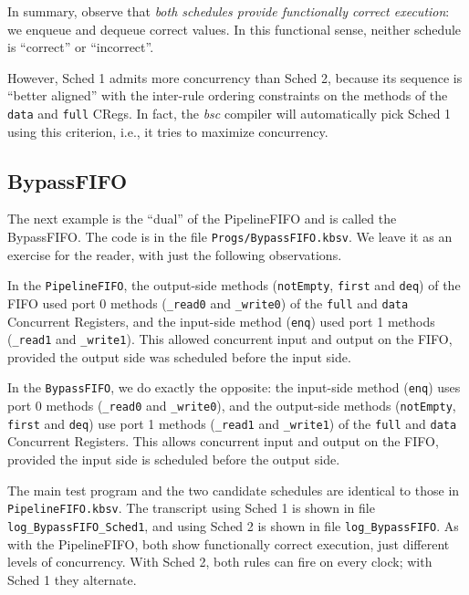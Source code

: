\documentclass[11pt]{article}
\newcommand{\term}[1]{\texttt{#1}}
\begin{document}
In summary, observe that \emph{both schedules provide functionally
correct execution}: we enqueue and dequeue correct values.  In this
functional sense, neither schedule is ``correct'' or ``incorrect''.

However, Sched 1 admits more concurrency than Sched 2, because its
sequence is ``better aligned'' with the inter-rule ordering
constraints on the methods of the \term{data} and \term{full} CRegs.
In fact, the \emph{bsc} compiler will automatically pick Sched 1 using
this criterion, i.e., it tries to maximize concurrency.


\subsection{BypassFIFO}

The next example is the ``dual'' of the PipelineFIFO and is called the
BypassFIFO.  The code is in the file \term{Progs/BypassFIFO.kbsv}.  We
leave it as an exercise for the reader, with just the following
observations.

In the \term{PipelineFIFO}, the output-side methods (\term{notEmpty},
\term{first} and \term{deq}) of the FIFO used port 0 methods
(\verb|_read0| and \verb|_write0|) of the \term{full} and \term{data}
Concurrent Registers, and the input-side method (\term{enq}) used port
1 methods (\verb|_read1| and \verb|_write1|).  This allowed concurrent
input and output on the FIFO, provided the output side was scheduled
before the input side.

In the \term{BypassFIFO}, we do exactly the opposite: the input-side
method (\term{enq}) uses port 0 methods (\verb|_read0| and
\verb|_write0|), and the output-side methods (\term{notEmpty},
\term{first} and \term{deq}) use port 1 methods (\verb|_read1| and
\verb|_write1|) of the \term{full} and \term{data} Concurrent Registers.  This
allows concurrent input and output on the FIFO, provided the input
side is scheduled before the output side.

The main test program and the two candidate schedules are identical to
those in \term{PipelineFIFO.kbsv}.  The transcript using Sched 1 is
shown in file \verb|log_BypassFIFO_Sched1|, and using Sched 2 is shown
in file \verb|log_BypassFIFO|.  As with the PipelineFIFO, both show
functionally correct execution, just different levels of concurrency.
With Sched 2, both rules can fire on every clock; with Sched 1 they
alternate.
\end{document}
